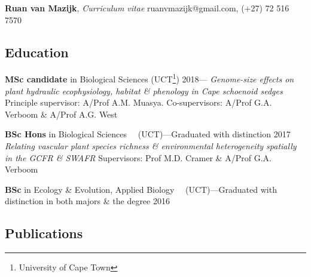 \documentclass[10pt]{article}
\begin{document}
{\Large
\textbf{Ruan van Mazijk}, \textit{Curriculum vitae}
  \hfill ruanvmazijk@gmail.com, (+27) 72 516 7570
}

\hrulefill

\subsection*{Education} %

\begin{hangparas}{2em}{1}

\textbf{MSc candidate} in Biological Sciences
  (UCT\footnote{University of Cape Town})
  \hfill 2018--- \break
\textit{Genome-size effects on plant hydraulic ecophysiology, habitat \&
  phenology in Cape schoenoid sedges} \break
Principle supervisor: A/Prof A.M. Muasya. Co-supervisors: A/Prof G.A. Verboom
 \& A/Prof A.G. West

\textbf{BSc Hons} in Biological Sciences
  ~~(UCT)---Graduated with distinction
  \hfill 2017 \break
\textit{Relating vascular plant species richness \& environmental heterogeneity
  spatially in the GCFR \& SWAFR} \break
Supervisors: Prof M.D. Cramer \& A/Prof G.A. Verboom

\textbf{BSc} in Ecology \& Evolution, Applied Biology
  ~~(UCT)---Graduated with distinction in both majors \& the degree
  \hfill 2016 \break

\hfill

\end{hangparas}

\subsection*{Publications} %
\end{document}
